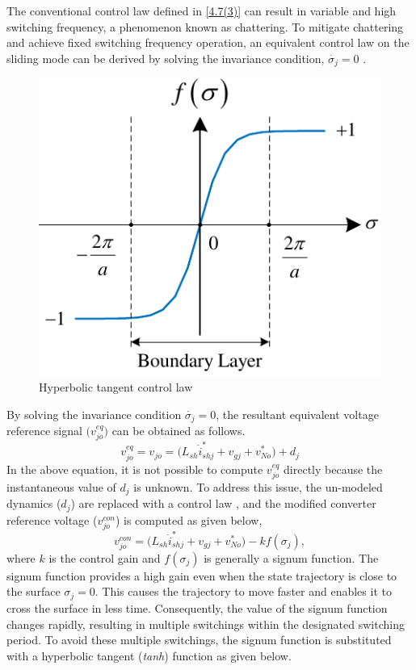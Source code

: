 The conventional control law defined in \eqref{4.7(3)} can result in variable and high switching frequency, a phenomenon known as chattering. To mitigate chattering and achieve fixed switching frequency operation, an equivalent control law on the sliding mode can be derived by solving the invariance condition, $\dot{\sigma_{j}} = 0$ \cite{Siew}.
\begin{figure}[b!]   
	\centering
	\includegraphics[scale=1]{figures/Chapter_4/Mine/Sigmoid}
	\caption{Hyperbolic tangent control law} 
	\label{4.sigmoid}
\end{figure}
By solving the invariance condition $\dot{\sigma_{j}} = 0$, the resultant equivalent voltage reference signal $\big(v^{eq}_{jo}\big)$ can be obtained as follows.
\begin{equation} \label{4.11}
	v^{eq}_{jo} = v_{jo} = \big(L_{sh} \dot{i}^{*}_{shj} + v_{gj} + v^{*}_{No} \big) + d_{j}
\end{equation} 
In the above equation,  it is not possible to compute $v^{eq}_{jo}$ directly because the instantaneous value of $d_{j}$ is unknown. To address this issue, the un-modeled dynamics ($d_{j}$) are replaced with a control law , and the modified converter reference voltage ($v^{con}_{jo}$) is computed as given below,  
\begin{equation} \label{4.12}
	v^{con}_{jo} = \big(L_{sh} \dot{i}^{*}_{shj} + v_{gj} + v^{*}_{No} \big) - kf(\sigma_{j}), 
\end{equation}
where $k$ is the control gain and $f(\sigma_{j})$ is generally a signum function. The signum function provides a high gain even when the state trajectory is close to the surface $\sigma_{j} = 0$. This causes the trajectory to move faster and enables it to cross the surface in less time. Consequently, the value of the signum function changes rapidly, resulting in multiple switchings within the designated switching period. To avoid these multiple switchings, the signum function is substituted with a hyperbolic tangent (\textit{tanh}) function as given below. 
